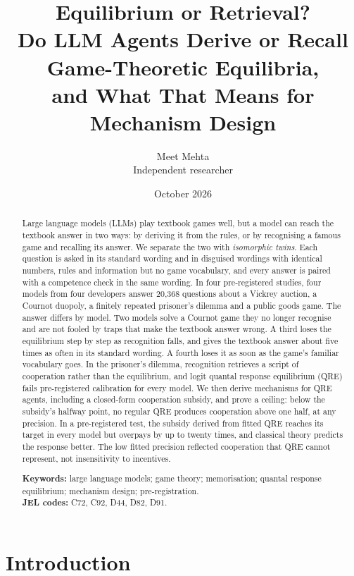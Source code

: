 \documentclass[11pt]{article}
\title{\textbf{Equilibrium or Retrieval?}\\[2pt]
\large Do LLM Agents Derive or Recall Game-Theoretic Equilibria,\\
and What That Means for Mechanism Design}
\author{Meet Mehta\\[2pt]\normalsize Independent researcher}
\date{October 2026}
\theoremstyle{definition}
\theoremstyle{remark}
\begin{document}
\maketitle

\begin{abstract}
Large language models (LLMs) play textbook games well, but a model can reach the textbook answer
in two ways: by deriving it from the rules, or by recognising a famous game and recalling its
answer. We separate the two with \emph{isomorphic twins}. Each question is asked in its standard
wording and in disguised wordings with identical numbers, rules and information but no game
vocabulary, and every answer is paired with a competence check in the same wording. In four
pre-registered studies, four models from four developers answer 20{,}368 questions about a Vickrey
auction, a Cournot duopoly, a finitely repeated prisoner's dilemma and a public goods game. The
answer differs by model. Two models solve a Cournot game they no longer recognise and are not
fooled by traps that make the textbook answer wrong. A third loses the equilibrium step by step
as recognition falls, and gives the textbook answer about five times as often in its standard wording. A
fourth loses it as soon as the game's familiar vocabulary goes. In the prisoner's dilemma, recognition retrieves
a script of cooperation rather than the equilibrium, and logit quantal response equilibrium
(QRE) fails pre-registered calibration for every model. We then derive mechanisms for QRE
agents, including a closed-form cooperation subsidy, and prove a ceiling: below the subsidy's
halfway point, no regular QRE produces cooperation above one half, at any precision. In a
pre-registered test, the subsidy derived from fitted QRE reaches its target in every model but
overpays by up to twenty times, and classical theory predicts the response better. The low fitted
precision reflected cooperation that QRE cannot represent, not insensitivity to incentives.
\par\medskip
\noindent\textbf{Keywords:} large language models; game theory; memorisation; quantal response
equilibrium; mechanism design; pre-registration.\\
\textbf{JEL codes:} C72, C92, D44, D82, D91.
\end{abstract}


\section{Introduction}
\end{document}
